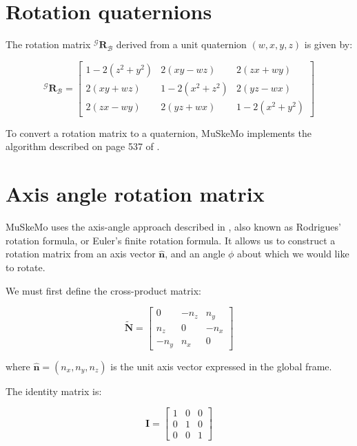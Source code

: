 \documentclass{article}
\begin{document}
\section{Rotation quaternions}
\label{sec:quaternions}


The rotation matrix \( {}^{\mathcal{G}} \mathbf{R}_{\mathcal{B}} \) derived from a unit quaternion \( (w, x, y, z) \) is given by:

\begin{equation}
{}^{\mathcal{G}} \mathbf{R}_{\mathcal{B}} =
\begin{bmatrix}
1 - 2(z^2 + y^2) & 2(xy - wz) & 2(zx + wy) \\
2(xy + wz) & 1 - 2(x^2 + z^2) & 2(yz - wx) \\
2(zx - wy) & 2(yz + wx) & 1 - 2(x^2 + y^2)
\end{bmatrix}
\end{equation}

To convert a rotation matrix to a quaternion, MuSkeMo implements the algorithm described on page 537 of \cite{eberlyGamePhysics2004}.

\section{Axis angle rotation matrix}
\label{sec:axisanglerotation}
 MuSkeMo uses the axis-angle approach described in \cite{valleryAdvancedDynamics2019}, also known as Rodrigues' rotation formula, or Euler's finite rotation formula. It allows us to construct a rotation matrix from an axis vector \( \hat{\mathbf{n}} \), and an angle \( \phi \) about which we would like to rotate.

We must first define the cross-product matrix:

\begin{equation}
\tilde{\mathbf{N}} = 
\begin{bmatrix}
0 & -n_{z} & n_{y} \\
n_{z} & 0 & -n_{x} \\
-n_{y} & n_{x} & 0
\end{bmatrix}
\end{equation}

where \( \hat{\mathbf{n}} = (n_x, n_y, n_z) \) is the unit axis vector expressed in the global frame.

The identity matrix is:

\begin{equation}
\mathbf{I} = 
\begin{bmatrix}
1 & 0 & 0 \\
0 & 1 & 0 \\
0 & 0 & 1
\end{bmatrix}
\end{equation}
\end{document}
